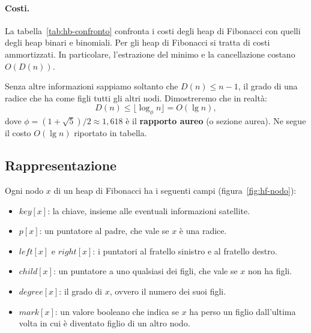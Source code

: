 \paragraph{Costi.}
La tabella~\ref{tab:hb-confronto} confronta i costi degli heap di Fibonacci con quelli degli heap binari e binomiali. Per gli heap di Fibonacci si tratta di costi ammortizzati. In particolare, l'estrazione del minimo e la cancellazione costano $O(D(n))$.

Senza altre informazioni sappiamo soltanto che $D(n) \le n - 1$, il grado di una radice che ha come figli tutti gli altri nodi. Dimostreremo che in realtà:
\[
D(n) \le \lfloor \log_\phi n \rfloor = O(\lg n),
\]
dove $\phi = (1+\sqrt{5})/2 \approx 1{,}618$ è il \textbf{rapporto aureo} (o sezione aurea). Ne segue il costo $O(\lg n)$ riportato in tabella.

\subsection{Rappresentazione}\label{sec:hf-rappresentazione}
Ogni nodo $x$ di un heap di Fibonacci ha i seguenti campi (figura~\ref{fig:hf-nodo}):
\begin{itemize}
    \item $\mathit{key}[x]$: la chiave, insieme alle eventuali informazioni satellite.
    \item $p[x]$: un puntatore al padre, che vale \Nil{} se $x$ è una radice.
    \item $\mathit{left}[x]$ e $\mathit{right}[x]$: i puntatori al fratello sinistro e al fratello destro.
    \item $\mathit{child}[x]$: un puntatore a uno qualsiasi dei figli, che vale \Nil{} se $x$ non ha figli.
    \item $\mathit{degree}[x]$: il grado di $x$, ovvero il numero dei suoi figli.
    \item $\mathit{mark}[x]$: un valore booleano che indica se $x$ ha perso un figlio dall'ultima volta in cui è diventato figlio di un altro nodo.
\end{itemize}

